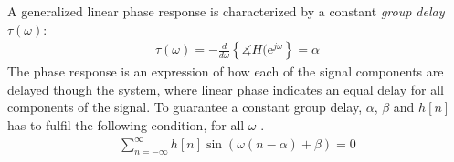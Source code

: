 A generalized linear phase response is characterized by a constant \textit{group delay} $\tau(\omega)$:
\begin{align}
\tau(\omega)=-\frac{d}{d\omega}\left\{ \measuredangle H(\text{e}^{j\omega} \right\} = \alpha
\end{align}
The phase response is an expression of how each of the signal components are delayed though the system, where linear phase indicates an equal delay for all components of the signal. To guarantee a constant group delay, $\alpha$, $\beta$ and $h[n]$ has to fulfil the following condition, for all $\omega$ \cite{DTSP, p. 341}.
\begin{align}\label{eq:cons_gro}
\sum_{n=-\infty}^{\infty}h[n]\sin\left(\omega \left(n-\alpha \right) + \beta \right) = 0
\end{align}


